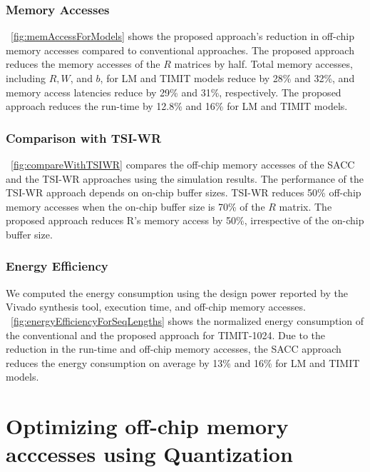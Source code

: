 \documentclass[a4paper,10pt]{article}
\begin{document}
\subsubsection{Memory Accesses}
\figurename{~\ref{fig:memAccessForModels}} shows the proposed approach's reduction in off-chip memory accesses compared to conventional approaches. The proposed approach reduces the memory accesses of the $R$ matrices by half. Total memory accesses, including $R, W$, and $b$, for LM and TIMIT models reduce by 28\% and 32\%, and memory access latencies reduce by 29\% and 31\%, respectively.
The proposed approach reduces the run-time by 12.8\% and 16\% for LM and TIMIT models. 
\subsubsection{Comparison with TSI-WR}
\figurename{~\ref{fig:compareWithTSIWR}} compares the off-chip memory accesses of the SACC and the TSI-WR approaches using the simulation results. The performance of the TSI-WR approach depends on on-chip buffer sizes. TSI-WR reduces 50\% off-chip memory accesses when the on-chip buffer size is 70\% of the $R$ matrix. The proposed approach reduces R's memory access by 50\%, irrespective of the on-chip buffer size.
\subsubsection{Energy Efficiency}
We computed the energy consumption using the design power reported by the Vivado synthesis tool, execution time, and off-chip memory accesses. \figurename{~\ref{fig:energyEfficiencyForSeqLengths}} shows the normalized energy consumption of the conventional and the proposed approach for TIMIT-1024. Due to the reduction in the run-time and off-chip memory accesses, the SACC approach reduces the energy consumption on average by 13\% and 16\% for LM and TIMIT models.

\section{Optimizing off-chip memory acccesses using Quantization}


\end{document}
